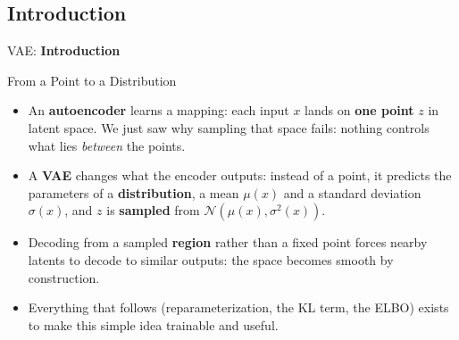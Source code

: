 \subsection{Introduction}
\begin{frame}{}
    \LARGE VAE: \textbf{Introduction}
\end{frame}

\begin{frame}{From a Point to a Distribution}
\begin{itemize}
    \item An \textbf{autoencoder} learns a mapping: each input $x$ lands on \textbf{one point} $z$ in latent space. We just saw why sampling that space fails: nothing controls what lies \emph{between} the points.
    \item A \textbf{VAE} changes what the encoder outputs: instead of a point, it predicts the parameters of a \textbf{distribution}, a mean $\mu(x)$ and a standard deviation $\sigma(x)$, and $z$ is \textbf{sampled} from $\mathcal{N}(\mu(x), \sigma^2(x))$.
    \item Decoding from a sampled \textbf{region} rather than a fixed point forces nearby latents to decode to similar outputs: the space becomes smooth by construction.
    \item Everything that follows (reparameterization, the KL term, the ELBO) exists to make this simple idea trainable and useful.
\end{itemize}
\end{frame}


